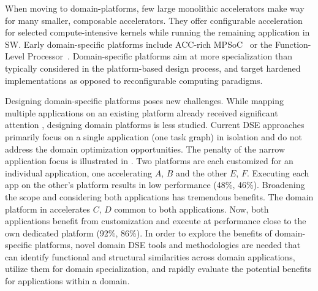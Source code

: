 When moving to domain-platforms, few large monolithic accelerators make way for many smaller, composable accelerators. They offer 
configurable acceleration for selected compute-intensive kernels while running the remaining application in SW. Early domain-specific platforms include ACC-rich MPSoC~\cite{cong2014accelerator} or the Function-Level Processor~\cite{tabkhi2016function}. Domain-specific platforms aim at more specialization than typically considered in the platform-based design process, and target hardened implementations as opposed to reconfigurable computing  \cite{wildermann2011operational} paradigms.


Designing domain-specific platforms poses new challenges. 
While mapping multiple applications on an existing platform already received significant attention   \cite{kuang2005partitioning,wu2006low,abdeen2014multi,tang2015hardware}, 
designing domain platforms is less studied. 
Current DSE approaches primarily focus on a single application (one task graph) in isolation and do not address the domain optimization opportunities. 
The penalty of the narrow application focus is illustrated in . Two platforms are each customized for an individual application, one accelerating $A$, $B$ and the other $E$, $F$. Executing each app on the other's platform results in low performance (48\%, 46\%).  Broadening the scope and considering both applications has tremendous benefits. The domain platform in  accelerates $C$, $D$ common to both applications. Now, both applications benefit from customization and execute at performance close to the own dedicated platform (92\%, 86\%). In order to explore the benefits of domain-specific platforms,  novel domain DSE tools and methodologies are needed that can identify functional and structural similarities across domain applications, utilize them for domain specialization, and rapidly evaluate the potential benefits for applications within a domain.

